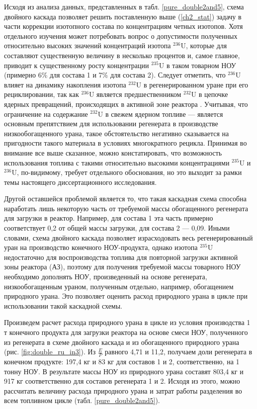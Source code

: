 Исходя из анализа данных, представленных в табл. \ref{pure_double2and5}, схема двойного каскада позволяет решить поставленную выше (\ref{ch2_stat}) задачу в части коррекции изотопного состава по концентрациям четных изотопов. Хотя отдельного изучения может потребовать вопрос о допустимости полученных относительно высоких значений концентраций изотопа $^{236}$U, которые для составляют существенную величину в несколько процентов и, самое главное, приводит к существенному росту концентрации $^{235}$U в таком товарном НОУ (примерно 6\% для состава 1 и 7\% для состава 2). Следует отметить, что $^{236}$U влияет на динамику накопления изотопа $^{232}$U в регенерированном уране при его рециклировании, так как $^{236}$U является предшественником $^{232}$U в цепочке ядерных превращений, происходящих в активной зоне реактора \cite{smirnovEvolutionIsotopicComposition2012}. Учитывая, что ограничение на содержание $^{232}$U в свежем ядерном топливе --- является основным препятствием для использовании регенерата в производстве низкообогащенного урана, такое обстоятельство негативно сказывается на пригодности такого материала в условиях многократного рецикла. Принимая во внимание все выше сказанное, можно констатировать, что возможность использования топлива с такими относительно высокими концентрациями $^{235}$U и $^{236}$U, по-видимому, требует отдельного обоснования, но это выходит за рамки темы настоящего диссертационного исследования.

Другой оставшейся проблемой является то, что такая каскадная схема способна наработать лишь некоторую часть от требуемой массы обогащенного регенерата для загрузки в реактор. Например, для состава 1 эта часть примерно соответствует 0,2 от общей массы загрузки, для состава 2 --- 0,09. Иными словами, схема двойного каскада позволяет израсходовать весь регенерированный уран на производство конечного НОУ-продукта, однако изотопа $^{235}$U недостаточно для воспроизводства топлива для повторной загрузки активной зоны реактора (АЗ), поэтому для получения требуемой массы товарного НОУ необходимо дополнять НОУ, произведенный на основе регенерата, низкообогащенным ураном, полученным отдельно, например, обогащением природного урана. Это позволяет оценить расход природного урана в цикле при использовании такой каскадной схемы. 

Произведем расчет расхода природного урана в цикле из условия производства 1 т конечного продукта для загрузки реактора на основе смеси НОУ, полученного из регенерата в схеме двойного каскада и из обогащенного природного урана (рис. \ref{fig:double_ru_in3}). Из $\frac{E}{P}$ равного 4,71 и 11,2, получаем доли регенерата в конечном продукте: 197,4 кг и 83 кг для составов 1 и 2, соответственно, на 1 тонну НОУ. В результате массы НОУ из природного урана составят 803,4 кг и 917 кг соответственно для составов регенерата 1 и 2. Исходя из этого, можно рассчитать величину расхода природного урана и затрат работы разделения во всем топливном цикле (табл. \ref{pure_double2and5}).

